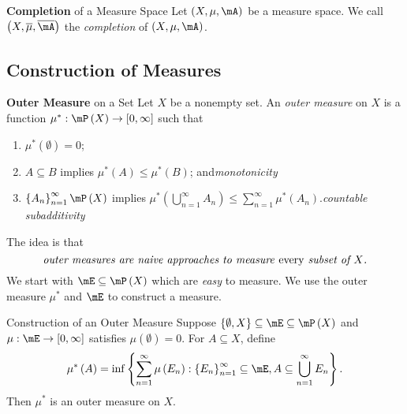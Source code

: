 \documentclass[pmath451]{subfiles}
\begin{document}
    \begin{definition}{\textbf{Completion} of a Measure Space}
        Let $\left( X,\mu,\mA \right)$ be a measure space. We call $\left( X,\overline{\mu},\overline{\mA} \right)$ the \emph{completion} of $\left( X,\mu,\mA \right)$.
    \end{definition}

    \subsection{Construction of Measures}

    \begin{definition}{\textbf{Outer Measure} on a Set}
        Let $X$ be a nonempty set. An \emph{outer measure} on $X$ is a function $\mu^{*}:\mP\left( X \right)\to\left[ 0,\infty \right]$ such that
        \begin{enumerate}
            \item $\mu^{*}\left( \emptyset \right) = 0$;
            \item $A\subseteq B$ implies $\mu^{*}\left( A \right)\leq\mu^{*}\left( B \right)$; and\hfill\textit{monotonicity}
            \item $\left\lbrace A_n \right\rbrace^{\infty}_{n=1}\mP\left( X \right)$ implies $\mu^{*}\left( \bigcup^{\infty}_{n=1} A_n \right) \leq \sum^{\infty}_{n=1}\mu^{*}\left( A_n \right)$.\hfill\textit{countable subadditivity}
        \end{enumerate}
    \end{definition}
    
    \np The idea is that
    \begin{equation*}
        \text{\textit{outer measures are naive approaches to measure \emph{every} subset of $X$.}}
    \end{equation*}
    We start with $\mE\subseteq\mP\left( X \right)$ which are \textit{easy} to measure. We use the outer measure $\mu^{*}$ and $\mE$ to construct a measure.

    \begin{prop}{Construction of an Outer Measure}
        Suppose $\left\lbrace \emptyset,X \right\rbrace\subseteq\mE\subseteq\mP\left( X \right)$ and $\mu:\mE\to\left[ 0,\infty \right]$ satisfies $\mu\left( \emptyset \right) = 0$. For $A\subseteq X$, define
        \begin{equation*}
            \mu^{*}\left( A \right) = \inf \left\lbrace \sum^{\infty}_{n=1} \mu\left( E_n \right) : \left\lbrace E_n \right\rbrace^{\infty}_{n=1}\subseteq\mE, A\subseteq\bigcup^{\infty}_{n=1} E_n \right\rbrace.
        \end{equation*}
        Then $\mu^{*}$ is an outer measure on $X$.
    \end{prop}
    
\end{document}
